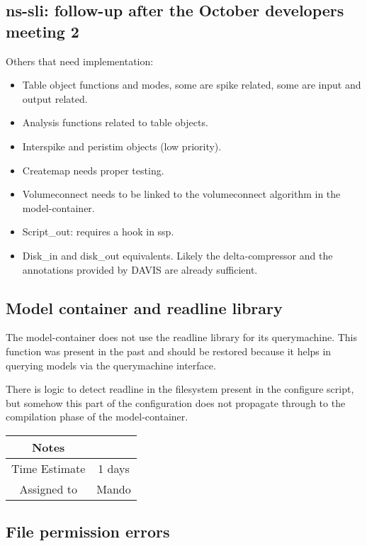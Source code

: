 \documentclass[12pt]{article}
\begin{document}
\subsection{ns-sli: follow-up after the October developers meeting 2}

Others that need implementation:

\begin{itemize}
\item Table object functions and modes, some are spike related, some
  are input and output related.
\item Analysis functions related to table objects.
\item Interspike and peristim objects (low priority).
\item Createmap needs proper testing.
\item Volumeconnect needs to be linked to the volumeconnect algorithm
  in the model-container.
\item Script\_out: requires a hook in ssp.
\item Disk\_in and disk\_out equivalents.  Likely the delta-compressor
  and the annotations provided by DAVIS are already sufficient.
\end{itemize}

\subsection{Model container and readline library}

The model-container does not use the readline library for its
querymachine.  This function was present in the past and should be
restored because it helps in querying models via the querymachine
interface.

There is logic to detect readline in the filesystem present in the
configure script, but somehow this part of the configuration does not
propagate through to the compilation phase of the model-container.

{
  \vspace{5mm}
  \centering
  \begin{tabular}{|c|c|}
    \hline
    Notes
    & \\
    \hline
    Time Estimate
    & 1 days \\
    \hline
    Assigned to
    & Mando \\
    \hline
  \end{tabular}
}


\subsection{File permission errors}
\end{document}
